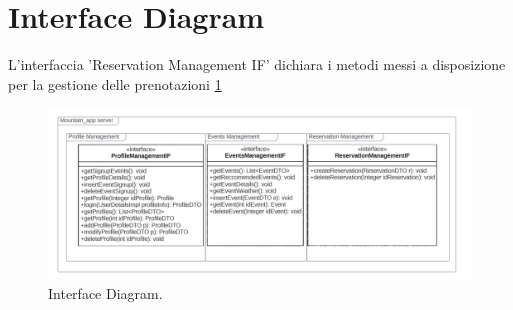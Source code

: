 \section{Interface Diagram}
L'interfaccia 'Reservation Management IF' dichiara i metodi messi a disposizione per la gestione delle prenotazioni \ref{fig:InterfaceDiagram}
\begin{figure}[h!]
	\centering
	\includegraphics[width=0.8\linewidth]{diagrams/Interface.drawio.png}
	\caption{Interface Diagram.}
	\label{fig:InterfaceDiagram}
\end{figure}